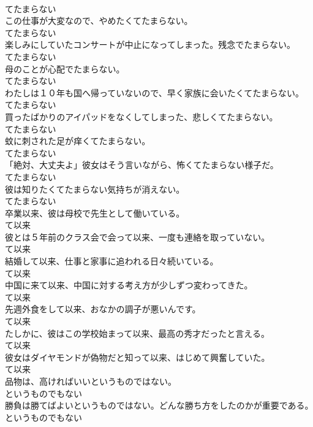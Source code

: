 \documentclass[8pt]{extreport}
\begin{document}
\begin{CJK}{UTF8}{min}
\\	てたまらない
\\	この仕事が大変なので、やめたくてたまらない。	
\\	てたまらない
\\	楽しみにしていたコンサートが中止になってしまった。残念でたまらない。	
\\	てたまらない
\\	母のことが心配でたまらない。	
\\	てたまらない
\\	わたしは１０年も国へ帰っていないので、早く家族に会いたくてたまらない。	
\\	てたまらない
\\	買ったばかりのアイパッドをなくしてしまった、悲しくてたまらない。	
\\	てたまらない
\\	蚊に刺された足が痒くてたまらない。	
\\	てたまらない
\\	「絶対、大丈夫よ」彼女はそう言いながら、怖くてたまらない様子だ。	
\\	てたまらない
\\	彼は知りたくてたまらない気持ちが消えない。	
\\	てたまらない
\\	卒業以来、彼は母校で先生として働いている。	
\\	て以来
\\	彼とは５年前のクラス会で会って以来、一度も連絡を取っていない。	
\\	て以来
\\	結婚して以来、仕事と家事に追われる日々続いている。	
\\	て以来
\\	中国に来て以来、中国に対する考え方が少しずつ変わってきた。	
\\	て以来
\\	先週外食をして以来、おなかの調子が悪いんです。	
\\	て以来
\\	たしかに、彼はこの学校始まって以来、最高の秀才だったと言える。	
\\	て以来
\\	彼女はダイヤモンドが偽物だと知って以来、はじめて興奮していた。	
\\	て以来
\\	品物は、高ければいいというものではない。	
\\	というものでもない
\\	勝負は勝てばよいというものではない。どんな勝ち方をしたのかが重要である。	
\\	というものでもない

\end{CJK}
\end{document}
